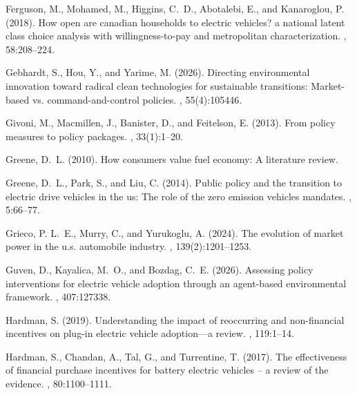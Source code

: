 \documentclass[12pt]{article}
\begin{document}
\begin{thebibliography}{}
Ferguson, M., Mohamed, M., Higgins, C.~D., Abotalebi, E., and Kanaroglou, P.
  (2018).
\newblock How open are canadian households to electric vehicles? a national
  latent class choice analysis with willingness-to-pay and metropolitan
  characterization.
,
  58:208--224.

Gebhardt, S., Hou, Y., and Yarime, M. (2026).
\newblock Directing environmental innovation toward radical clean technologies
  for sustainable transitions: Market-based vs. command-and-control policies.
, 55(4):105446.

Givoni, M., Macmillen, J., Banister, D., and Feitelson, E. (2013).
\newblock From policy measures to policy packages.
, 33(1):1--20.

Greene, D.~L. (2010).
\newblock How consumers value fuel economy: A literature review.

Greene, D.~L., Park, S., and Liu, C. (2014).
\newblock Public policy and the transition to electric drive vehicles in the
  us: The role of the zero emission vehicles mandates.
, 5:66--77.

Grieco, P. L.~E., Murry, C., and Yurukoglu, A. (2024).
\newblock The evolution of market power in the u.s. automobile industry.
, 139(2):1201--1253.

Guven, D., Kayalica, M.~O., and Bozdag, C.~E. (2026).
\newblock Assessing policy interventions for electric vehicle adoption through
  an agent-based environmental framework.
, 407:127338.

Hardman, S. (2019).
\newblock Understanding the impact of reoccurring and non-financial incentives
  on plug-in electric vehicle adoption---a review.
, 119:1--14.

Hardman, S., Chandan, A., Tal, G., and Turrentine, T. (2017).
\newblock The effectiveness of financial purchase incentives for battery
  electric vehicles – a review of the evidence.
, 80:1100--1111.


\end{thebibliography}
\end{document}
